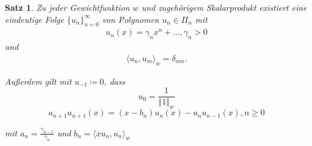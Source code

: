 \documentclass{book}
\newtheorem{theorem}[algorithm]{Satz}
\begin{document}
            \begin{theorem}\label{s55}
                Zu jeder Gewichtfunktion $w$ und zugehörigem Skalarprodukt existiert eine 
                eindeutige Folge $\{u_n\}_{n=0}^\infty$ von Polynomen $u_n\in\Pi_n$ mit
                \begin{align*}
                    u_n(x)=\gamma_nx^n + \dots, \gamma_n>0
                \end{align*} 
                und 
                \begin{align*}
                    \langle u_n,u_m \rangle_w=\delta_{nm}.
                \end{align*}

                Außerdem gilt mit $u_{-1}\coloneqq 0$, dass 
                \[u_0=\frac{1}{\left\Vert 1 \right\Vert_w}\]
                \begin{equation}
                    a_{n+1}u_{n+1}(x)=(x-b_n)u_n(x)-a_nu_{n-1}(x),n\geq 0\label{5.4}
                \end{equation}

                mit $a_n=\frac{\gamma_{n-1}}{\gamma_n}$ und $b_n=\langle xu_n, u_n \rangle_w$

            \end{theorem}
\end{document}
